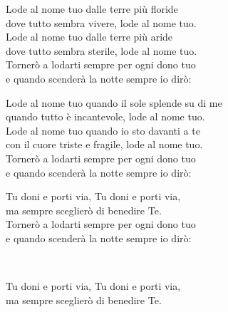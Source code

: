 
\strofa Lode al nome tuo dalle terre più floride\\
dove tutto sembra vivere, lode al nome tuo.\\
Lode al nome tuo dalle terre più aride\\
dove tutto sembra sterile, lode al nome tuo.\\
Tornerò a lodarti sempre per ogni dono tuo\\
e quando scenderà la notte sempre io dirò:

\spazio


\spazio

\strofa Lode al nome tuo quando il sole splende su di me\\
quando tutto è incantevole, lode al nome tuo.\\
Lode al nome tuo quando io sto davanti a te\\
con il cuore triste e fragile, lode al nome tuo.\\
Tornerò a lodarti sempre per ogni dono tuo\\
e quando scenderà la notte sempre io dirò:

\spazio


\spazio

Tu doni e porti via, Tu doni e porti via,\\
ma sempre sceglierò di benedire Te.\\
Tornerò a lodarti sempre per ogni dono tuo\\
e quando scenderà la notte sempre io dirò:

\spazio

 \\

\spazio

Tu doni e porti via, Tu doni e porti via,\\
ma sempre sceglierò di benedire Te. 

